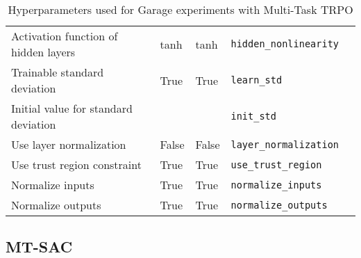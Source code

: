 \begin{table}[h!]
\begin{tabularx}{\linewidth}{ L{2in} X X X l }
    Activation function of hidden layers & tanh & tanh & \texttt{hidden\_nonlinearity} \\
    Trainable standard deviation & True & True & \texttt{learn\_std} \\
    Initial value for standard deviation &  &  & \texttt{init\_std} \\
    Use layer normalization & False & False & \texttt{layer\_normalization} \\
    Use trust region constraint & True & True & \texttt{use\_trust\_region} \\
    Normalize inputs & True & True & \texttt{normalize\_inputs} \\
    Normalize outputs & True & True & \texttt{normalize\_outputs} \\
    \bottomrule
\end{tabularx}
\caption{Hyperparameters used for Garage experiments with Multi-Task TRPO}
\label{tab:garage_trpo_hparams}
\end{table}

\FloatBarrier


\clearpage
\subsection{MT-SAC}

\FloatBarrier

